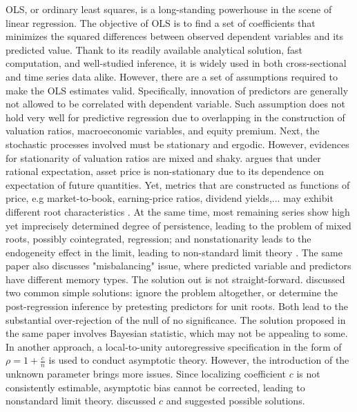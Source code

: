 \documentclass[12pt,a4paper]{article}
\begin{document}
OLS, or ordinary least squares, is a long-standing powerhouse in the scene of linear regression. The objective of OLS is to find a set of coefficients that minimizes the squared differences between observed dependent variables and its predicted value. Thank to its readily available analytical solution, fast computation, and well-studied inference, it is widely used in both cross-sectional and time series data alike. However, there are a set of assumptions required to make the OLS estimates valid. Specifically, innovation of predictors are generally not allowed to be correlated with dependent variable. Such assumption does not hold very well for predictive regression due to overlapping in the construction of valuation ratios, macroeconomic variables, and equity premium. Next, the stochastic processes involved must be stationary and ergodic. However, evidences for stationarity of valuation ratios are mixed and shaky. \cite{roll2002rational} argues that under rational expectation, asset price is non-stationary due to its dependence on expectation of future quantities. Yet, metrics that are constructed as functions of price, e.g market-to-book, earning-price ratios, dividend yields,... may exhibit different root characteristics \citep{phillips2015halbert}. At the same time, most remaining series show high yet imprecisely determined degree of persistence, leading to the problem of mixed roots, possibly cointegrated, regression; and nonstationarity leads to the endogeneity effect in the limit, leading to non-standard limit theory \citep{phillips2015halbert}. The same paper also discusses "misbalancing" issue, where predicted variable and predictors have different memory types. The solution out is not straight-forward. \cite{elliott1994inference} discussed two common simple solutions: ignore the problem altogether, or determine the post-regression inference by pretesting predictors for unit roots. Both lead to the substantial over-rejection of the null of no significance. The solution proposed in the same paper involves Bayesian statistic, which may not be appealing to some. In another approach, a local-to-unity autoregressive specification in the form of $ \rho = 1 + \frac{c}{n} $ is used to conduct asymptotic theory. However, the introduction of the unknown parameter brings more issues. Since localizing coefficient $c$ is not consistently estimable, asymptotic bias cannot be corrected, leading to nonstandard limit theory. \cite{phillips2013predictive} discussed $c$ and suggested possible solutions.
\end{document}
